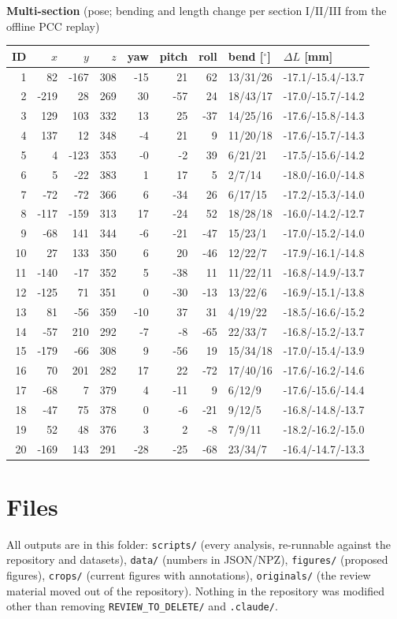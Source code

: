 \documentclass[10pt,a4paper]{article}
\begin{document}
\begin{minipage}[t]{0.6\linewidth}\scriptsize
\textbf{Multi-section} (pose; bending and length change per section I/II/III from the offline PCC replay)\\[2pt]
\begin{tabular}{rrrrrrrll}
\toprule
ID & $x$ & $y$ & $z$ & yaw & pitch & roll & bend [$^\circ$] & $\Delta L$ [mm]\\\midrule
1 & 82 & -167 & 308 & -15 & 21 & 62 & 13/31/26 & -17.1/-15.4/-13.7 \\
2 & -219 & 28 & 269 & 30 & -57 & 24 & 18/43/17 & -17.0/-15.7/-14.2 \\
3 & 129 & 103 & 332 & 13 & 25 & -37 & 14/25/16 & -17.6/-15.8/-14.3 \\
4 & 137 & 12 & 348 & -4 & 21 & 9 & 11/20/18 & -17.6/-15.7/-14.3 \\
5 & 4 & -123 & 353 & -0 & -2 & 39 & 6/21/21 & -17.5/-15.6/-14.2 \\
6 & 5 & -22 & 383 & 1 & 17 & 5 & 2/7/14 & -18.0/-16.0/-14.8 \\
7 & -72 & -72 & 366 & 6 & -34 & 26 & 6/17/15 & -17.2/-15.3/-14.0 \\
8 & -117 & -159 & 313 & 17 & -24 & 52 & 18/28/18 & -16.0/-14.2/-12.7 \\
9 & -68 & 141 & 344 & -6 & -21 & -47 & 15/23/1 & -17.0/-15.2/-14.0 \\
10 & 27 & 133 & 350 & 6 & 20 & -46 & 12/22/7 & -17.9/-16.1/-14.8 \\
11 & -140 & -17 & 352 & 5 & -38 & 11 & 11/22/11 & -16.8/-14.9/-13.7 \\
12 & -125 & 71 & 351 & 0 & -30 & -13 & 13/22/6 & -16.9/-15.1/-13.8 \\
13 & 81 & -56 & 359 & -10 & 37 & 31 & 4/19/22 & -18.5/-16.6/-15.2 \\
14 & -57 & 210 & 292 & -7 & -8 & -65 & 22/33/7 & -16.8/-15.2/-13.7 \\
15 & -179 & -66 & 308 & 9 & -56 & 19 & 15/34/18 & -17.0/-15.4/-13.9 \\
16 & 70 & 201 & 282 & 17 & 22 & -72 & 17/40/16 & -17.6/-16.2/-14.6 \\
17 & -68 & 7 & 379 & 4 & -11 & 9 & 6/12/9 & -17.6/-15.6/-14.4 \\
18 & -47 & 75 & 378 & 0 & -6 & -21 & 9/12/5 & -16.8/-14.8/-13.7 \\
19 & 52 & 48 & 376 & 3 & 2 & -8 & 7/9/11 & -18.2/-16.2/-15.0 \\
20 & -169 & 143 & 291 & -28 & -25 & -68 & 23/34/7 & -16.4/-14.7/-13.3 \\
\bottomrule
\end{tabular}
\end{minipage}

\section{Files}
All outputs are in this folder: \texttt{scripts/} (every analysis, re-runnable against the repository and datasets), \texttt{data/} (numbers in JSON/NPZ), \texttt{figures/} (proposed figures), \texttt{crops/} (current figures with annotations), \texttt{originals/} (the review material moved out of the repository). Nothing in the repository was modified other than removing \texttt{REVIEW\_TO\_DELETE/} and \texttt{.claude/}.
\end{document}
